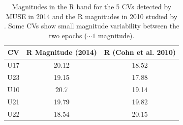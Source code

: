 
\begin{table}[h]
\centering
\begin{tabular}{|c|c|c|}
\hline
\textbf{CV} & \textbf{R Magnitude (2014)} & \textbf{R (Cohn et al. 2010)} \\ \hline
U17         & 20.12                       & 18.52                          \\ \hline
U23         & 19.15                       & 17.88                       \\ \hline
U10         & 20.7                        & 19.14                     \\ \hline
U21         & 19.79                       & 19.82                    \\ \hline
U22         & 18.54                       & 20.15                              \\ \hline

\end{tabular}
   \caption{Magnitudes in the R band for the 5 CVs detected by MUSE in 2014 and the R magnitudes in 2010 studied by \cite{cohn_identification_2010}. Some CVs show small magnitude variability between the two epochs ($\sim 1$ magnitude).}
    \label{tab:truthTables}   
\end{table}

